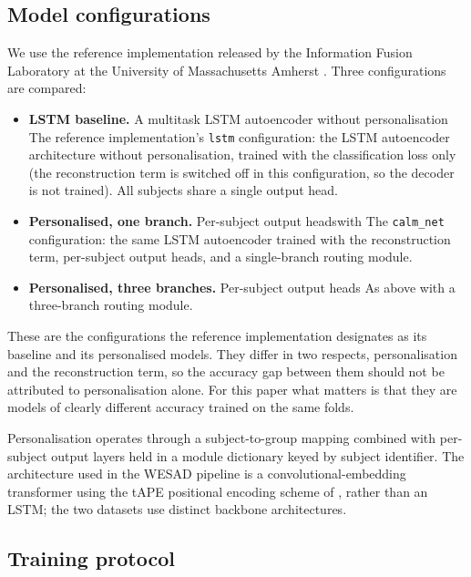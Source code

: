 \documentclass[preprint,12pt,authoryear]{elsarticle}
\providecommand{\DIFaddtex}[1]{{\protect\color{blue} \sf #1}} %
\providecommand{\DIFdeltex}[1]{{\protect\color{red} \scriptsize #1}} %
\providecommand{\DIFaddbegin}{} %
\providecommand{\DIFaddend}{} %
\providecommand{\DIFdelbegin}{} %
\providecommand{\DIFdelend}{} %
\providecommand{\DIFadd}[1]{\texorpdfstring{\DIFaddtex{#1}}{#1}} %
\providecommand{\DIFdel}[1]{\texorpdfstring{\DIFdeltex{#1}}{}} %
\newcommand{\DIFscaledelfig}{0.5}
\newlength{\DIFdelgraphicswidth} %
\newlength{\DIFdelgraphicsheight} %
\newcommand{\DIFaddincludegraphics}[2][]{{\color{blue}\fbox{\DIFOincludegraphics[#1]{#2}}}} %
\newcommand{\DIFdelincludegraphics}[2][]{%
\sbox{\DIFdelgraphicsbox}{\DIFOincludegraphics[#1]{#2}}%
\settoboxwidth{\DIFdelgraphicswidth}{\DIFdelgraphicsbox} %
\settoboxtotalheight{\DIFdelgraphicsheight}{\DIFdelgraphicsbox} %
\scalebox{\DIFscaledelfig}{%
\parbox[b]{\DIFdelgraphicswidth}{\usebox{\DIFdelgraphicsbox}\\[-\baselineskip] \rule{\DIFdelgraphicswidth}{0em}}\llap{\resizebox{\DIFdelgraphicswidth}{\DIFdelgraphicsheight}{%
\setlength{\unitlength}{\DIFdelgraphicswidth}%
\begin{picture}(1,1)%
\thicklines\linethickness{2pt} %
{\color[rgb]{1,0,0}\put(0,0){\framebox(1,1){}}}%
{\color[rgb]{1,0,0}\put(0,0){\line( 1,1){1}}}%
{\color[rgb]{1,0,0}\put(0,1){\line(1,-1){1}}}%
\end{picture}%
}\hspace*{3pt}}} %
} %
\DeclareRobustCommand{\DIFaddbegin}{\DIFOaddbegin \let\includegraphics\DIFaddincludegraphics} %
\DeclareRobustCommand{\DIFaddend}{\DIFOaddend \let\includegraphics\DIFOincludegraphics} %
\DeclareRobustCommand{\DIFdelbegin}{\DIFOdelbegin \let\includegraphics\DIFdelincludegraphics} %
\DeclareRobustCommand{\DIFdelend}{\DIFOaddend \let\includegraphics\DIFOincludegraphics} %
\begin{document}
\DIFdelend \subsection{Model configurations}

We use the reference implementation released by the Information Fusion
Laboratory at the University of Massachusetts Amherst \citep{iflrepo}.
Three configurations are compared:

\begin{itemize}
\item \textbf{LSTM baseline.} \DIFdelbegin \DIFdel{A multitask LSTM autoencoder without
personalisation}\DIFdelend \DIFaddbegin \DIFadd{The reference implementation's
\texttt{lstm} configuration: the LSTM autoencoder architecture without
personalisation, trained with the classification loss only (the
reconstruction term is switched off in this configuration, so the
decoder is not trained)}\DIFaddend . All subjects share a single output head.
\item \textbf{Personalised, one branch.} \DIFdelbegin \DIFdel{Per-subject output headswith
}\DIFdelend \DIFaddbegin \DIFadd{The \texttt{calm\_net}
configuration: the same LSTM autoencoder trained with the
reconstruction term, per-subject output heads, and }\DIFaddend a single-branch
routing module.
\item \textbf{Personalised, three branches.} \DIFdelbegin \DIFdel{Per-subject output heads
}\DIFdelend \DIFaddbegin \DIFadd{As above }\DIFaddend with a
three-branch routing module.
\end{itemize}

\DIFaddbegin \DIFadd{These are the configurations the reference implementation designates as
its baseline and its personalised models. They differ in two respects,
personalisation and the reconstruction term, so the accuracy gap
between them should not be attributed to personalisation alone. For
this paper what matters is that they are models of clearly different
accuracy trained on the same folds.
}

\DIFaddend Personalisation operates through a subject-to-group mapping combined
with per-subject output layers held in a module dictionary keyed by
subject identifier.
\DIFdelbegin \DIFdel{The architecture used in the WESAD pipeline is a
convolutional-embedding transformer using the tAPE positional encoding
scheme of \citet{foumani2024}, rather than an LSTM; the two datasets use
distinct backbone architectures.
}\DIFdelend 

\subsection{Training protocol}
\DIFaddbegin \label{sec:protocol}
\DIFaddend 
\end{document}
